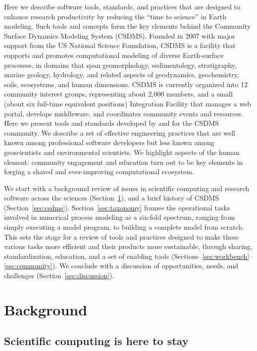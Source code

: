 \documentclass[journal abbreviation, manuscript]{copernicus}
\begin{document}
Here we describe software tools, standards, and practices that are designed to enhance research productivity by reducing the ``time to science'' in Earth modeling. Such tools and concepts form the key elements behind the Community Surface Dynamics Modeling System (CSDMS). Founded in 2007 with major support from the US National Science Foundation, CSDMS is a facility that supports and promotes computational modeling of diverse Earth-surface processes, in domains that span geomorphology, sedimentology, stratigraphy, marine geology, hydrology, and related aspects of geodynamics, geochemistry, soils, ecosystems, and human dimensions. CSDMS is currently organized into 12 community interest groups, representing about 2,000 members, and a small (about six full-time equivalent positions) Integration Facility that manages a web portal, develops middleware, and coordinates community events and resources. Here we present tools and standards developed by and for the CSDMS community. We describe a set of effective engineering practices that are well known among professional software developers but less known among geoscientists and environmental scientists. We highlight aspects of the human element: community engagement and education turn out to be key elements in forging a shared and ever-improving computational ecosystem.

We start with a background review of issues in scientific computing and research software across the sciences (Section~\ref{sec:background}), and a brief history of CSDMS (Section~\ref{sec:csdms}). Section~\ref{sec:taxonomy} frames the operational tasks involved in numerical process modeling as a six-fold spectrum, ranging from simply executing a model program, to building a complete model from scratch. This sets the stage for a review of tools and practices designed to make these various tasks more efficient and their products more sustainable, through sharing, standardization, education, and a set of enabling tools (Sections~\ref{sec:workbench}--\ref{sec:community}). We conclude with a discussion of opportunities, needs, and challenges (Section~\ref{sec:discussion}).


\section{Background}
\label{sec:background}

\subsection{Scientific computing is here to stay}
\end{document}
